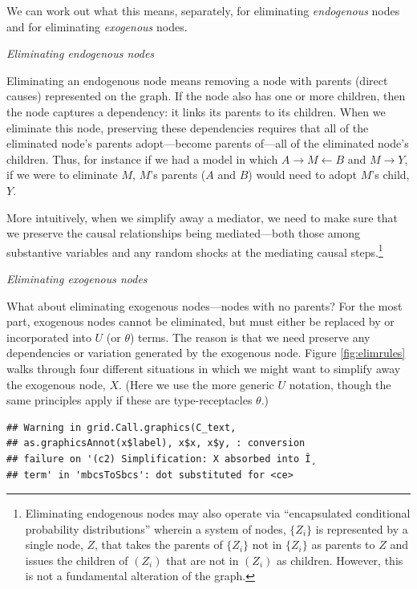 \documentclass[
  12pt,
]{book}
\begin{document}
We can work out what this means, separately, for eliminating \emph{endogenous} nodes and for eliminating \emph{exogenous} nodes.

\emph{Eliminating endogenous nodes}

Eliminating an endogenous node means removing a node with parents (direct causes) represented on the graph. If the node also has one or more children, then the node captures a dependency: it links its parents to its children. When we eliminate this node, preserving these dependencies requires that all of the eliminated node's parents adopt---become parents of---all of the eliminated node's children. Thus, for instance if we had a model in which \(A \rightarrow M \leftarrow B\) and \(M \rightarrow Y\), if we were to eliminate \(M\), \(M\)'s parents (\(A\) and \(B\)) would need to adopt \(M\)'s child, \(Y\).

More intuitively, when we simplify away a mediator, we need to make sure that we preserve the causal relationships being mediated---both those among substantive variables and any random shocks at the mediating causal steps.\footnote{Eliminating endogenous nodes may also operate via ``encapsulated conditional probability distributions'' \citep{koller2009probabilistic} wherein a system of nodes, \(\{Z_i\}\) is represented by a single node, \(Z\), that takes the parents of \(\{Z_i\}\) not in \(\{Z_i\}\) as parents to \(Z\) and issues the children of \((Z_i)\) that are not in \((Z_i)\) as children. However, this is not a fundamental alteration of the graph.}

\emph{Eliminating exogenous nodes}

What about eliminating exogenous nodes---nodes with no parents? For the most part, exogenous nodes cannot be eliminated, but must either be replaced by or incorporated into \(U\) (or \(\theta\)) terms. The reason is that we need preserve any dependencies or variation generated by the exogenous node. Figure \ref{fig:elimrules} walks through four different situations in which we might want to simplify away the exogenous node, \(X\). (Here we use the more generic \(U\) notation, though the same principles apply if these are type-receptacles \(\theta\).)

\begin{verbatim}
## Warning in grid.Call.graphics(C_text,
## as.graphicsAnnot(x$label), x$x, x$y, : conversion
## failure on '(c2) Simplification: X absorbed into Î¸
## term' in 'mbcsToSbcs': dot substituted for <ce>
\end{verbatim}
\end{document}
